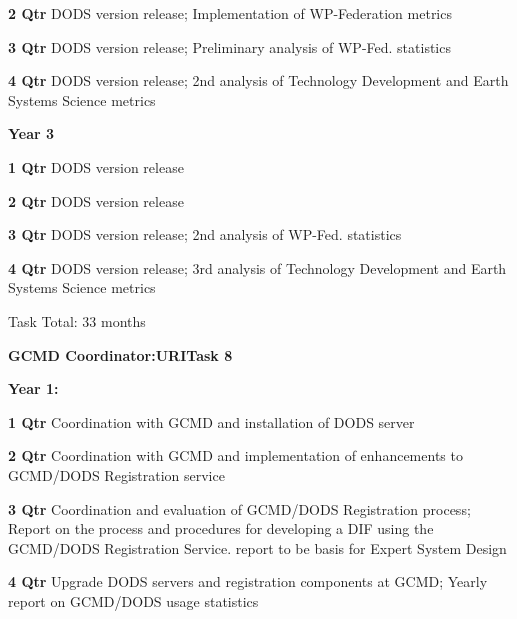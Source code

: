 \documentclass[12pt]{article}
\begin{document}
\begin{description}
\begin{description}
   \item{\bf 2 Qtr} DODS version release; Implementation of WP-Federation
     metrics

   \item{\bf 3 Qtr} DODS version release; Preliminary analysis of
     WP-Fed. statistics

   \item{\bf 4 Qtr} DODS version release; 2nd analysis of Technology
     Development and Earth Systems Science metrics

   \end{description}
 \item{\large \bf Year 3}
   \begin{description}
   \item{\bf 1 Qtr} DODS version release

   \item{\bf 2 Qtr} DODS version release

   \item{\bf 3 Qtr} DODS version release; 2nd analysis of WP-Fed.  statistics

   \item{\bf 4 Qtr} DODS version release; 3rd analysis of Technology
     Development and Earth Systems Science metrics

 Task Total: 33 months


\end{description}
\begin{center}
{\large \bf GCMD Coordinator:URITask 8}
\end{center}

 \item{\large \bf Year 1:}
   \begin{description}
   \item{\bf 1 Qtr} Coordination with GCMD and installation of DODS server

   \item{\bf 2 Qtr} Coordination with GCMD and implementation of enhancements
     to GCMD/DODS Registration service

   \item{\bf 3 Qtr} Coordination and evaluation of GCMD/DODS Registration
     process; Report on the process and procedures for developing a DIF using
     the GCMD/DODS Registration Service. report to be basis for Expert System
     Design

   \item{\bf 4 Qtr} Upgrade DODS servers and registration components at GCMD;
     Yearly report on GCMD/DODS usage statistics


\end{description}
\end{description}
\end{document}
